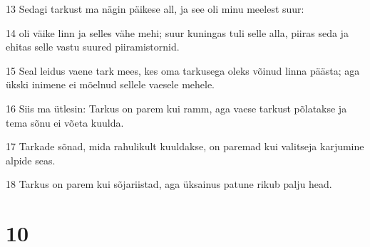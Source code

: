\par 13 Sedagi tarkust ma nägin päikese all, ja see oli minu meelest suur:
\par 14 oli väike linn ja selles vähe mehi; suur kuningas tuli selle alla, piiras seda ja ehitas selle vastu suured piiramistornid.
\par 15 Seal leidus vaene tark mees, kes oma tarkusega oleks võinud linna päästa; aga ükski inimene ei mõelnud sellele vaesele mehele.
\par 16 Siis ma ütlesin: Tarkus on parem kui ramm, aga vaese tarkust põlatakse ja tema sõnu ei võeta kuulda.
\par 17 Tarkade sõnad, mida rahulikult kuuldakse, on paremad kui valitseja karjumine alpide seas.
\par 18 Tarkus on parem kui sõjariistad, aga üksainus patune rikub palju head.

\chapter{10}

